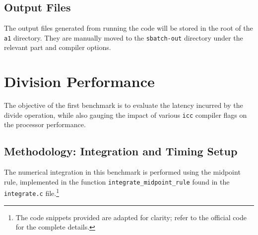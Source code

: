 \documentclass{article}
\begin{document}
\subsection{Output Files}
The output files generated from running the code will be stored in the root of the \texttt{a1} directory. They are manually moved 
to the \texttt{sbatch-out} directory under the relevant part and compiler options.

\section{Division Performance}
The objective of the first benchmark is to evaluate the latency incurred by the divide operation, while also gauging the impact of various \texttt{icc} compiler flags on the processor performance. 

\subsection*{Methodology: Integration and Timing Setup}
The numerical integration in this benchmark is performed using the midpoint rule, implemented in the function \texttt{integrate\_midpoint\_rule} found in the \texttt{integrate.c} file.\footnote{The code snippets provided are adapted for clarity; refer to the official code for the complete details.}
\end{document}
